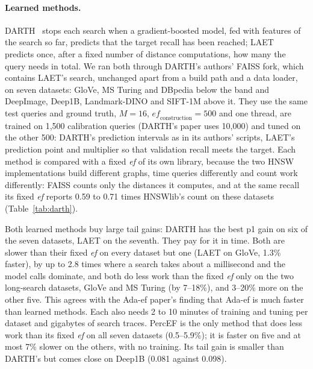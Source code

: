 \documentclass[sigconf,review=false,screen]{acmart}
\newcommand{\ef}{\textit{ef}}
\begin{document}
\paragraph{Learned methods.}
DARTH~\cite{chatzakis2026darth} stops each search when a gradient-boosted model, fed with features
of the search so far, predicts that the target recall has been reached; LAET~\cite{li2020laet}
predicts once, after a fixed number of distance computations, how many the query needs in total.
We ran both through DARTH's authors' FAISS fork, which contains LAET's search, unchanged apart from
a build path and a data loader, on seven datasets: GloVe, MS Turing and DBpedia below the band and
DeepImage, Deep1B, Landmark-DINO and SIFT-1M above it. They use the same test queries and ground
truth, $M = 16$, $\mathit{ef}_{\mathrm{construction}} = 500$ and one thread, are trained on 1,500
calibration queries (DARTH's paper uses 10,000) and tuned on the other 500: DARTH's prediction
intervals as in its authors' scripts, LAET's prediction point and multiplier so that validation
recall meets the target. Each method is compared with a fixed \ef{} of its own library, because the
two HNSW implementations build different graphs, time queries differently and count work
differently: FAISS counts only the distances it computes, and at the same recall its fixed \ef{}
reports 0.59 to 0.71 times HNSWlib's count on these datasets (Table~\ref{tab:darth}).

Both learned methods buy large tail gains: DARTH has the best p1 gain on six of the seven datasets,
LAET on the seventh. They pay for it in time. Both are slower than their fixed \ef{} on every
dataset but one (LAET on GloVe, 1.3\% faster), by up to 2.8 times where a search takes about a
millisecond and the model calls dominate, and both do less work than the fixed \ef{} only on the
two long-search datasets, GloVe and MS Turing (by 7--18\%), and 3--20\% more on the other five. This
agrees with the Ada-ef paper's finding that Ada-ef is much faster than learned methods. Each also
needs 2 to 10 minutes of training and tuning per dataset and gigabytes of search traces. PercEF is
the only method that does less work than its fixed \ef{} on all seven datasets (0.5--5.9\%); it is
faster on five and at most 7\% slower on the others, with no training. Its tail gain is smaller than
DARTH's but comes close on Deep1B (0.081 against 0.098).
\end{document}

